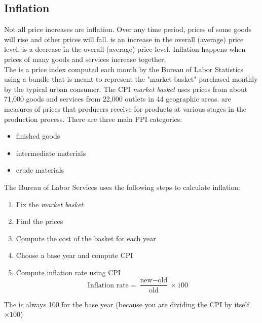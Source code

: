 \documentclass{article}
\begin{document}
\subsection{Inflation}

Not all price increases are inflation. Over any time period, prices of some goods will rise and other prices will fall.  is an increase in the overall (average) price level.  is a decrease in the overall (average) price level. Inflation happens when prices of many goods and services increase together. \\ 

The  is a price index computed each month by the Bureau of Labor Statistics using a bundle that is meant to represent the "market basket" purchased monthly by the typical urban consumer. The CPI \emph{market basket} uses prices from about 71,000 goods and services from 22,000 outlets in 44 geographic areas.  are measures of prices that producers receive for products at various stages in the production process. There are three main PPI categories:
\begin{itemize}
  \item finished goods 
  \item intermediate materials 
  \item crude materials
\end{itemize}

The Bureau of Labor Services uses the following steps to calculate inflation: 
\begin{enumerate}
  \item Fix the \emph{market basket} 
  \item Find the prices 
  \item Compute the cost of the basket for each year 
  \item Choose a base year and compute CPI 
  \item Compute inflation rate using CPI $$\textrm{Inflation rate} = \frac{\textrm{new} - \textrm{old}}{\textrm{old}} \times 100$$
\end{enumerate}

\begin{remark}
  The  is always 100 for the base year (because you are dividing the CPI by itself $\times 100$)
\end{remark}
\end{document}
